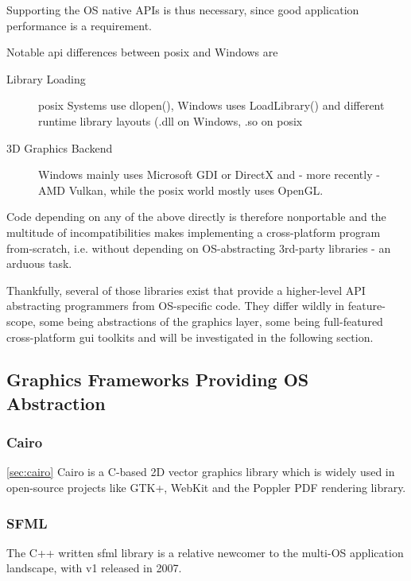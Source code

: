 Supporting the OS native APIs is thus necessary, since good application performance is a requirement.

Notable \gls{api} differences between \gls{posix} and Windows are
\begin{description}
	\item[Library Loading] \gls{posix} Systems use dlopen(), Windows uses LoadLibrary() and different runtime library layouts (.dll on Windows, .so on \gls{posix}
	\item[3D Graphics Backend] Windows mainly uses Microsoft GDI or DirectX and - more recently - AMD Vulkan, while the \gls{posix} world mostly uses OpenGL.
\end{description}

Code depending on any of the above directly is therefore nonportable and the multitude of incompatibilities makes implementing a cross-platform program from-scratch, i.e. without depending on OS-abstracting 3rd-party libraries - an arduous task.

Thankfully, several of those libraries exist that provide a higher-level API abstracting programmers from OS-specific code. They differ wildly in feature-scope, some being abstractions of the graphics layer, some being full-featured cross-platform \gls{gui} toolkits and will be investigated in the following section.

\subsection{Graphics Frameworks Providing OS Abstraction}
\label{sec:res_frameworks}

\subsubsection{Cairo}
\ref{sec:cairo}
Cairo is a C-based 2D vector graphics library which is widely used in open-source projects like GTK+, WebKit and the Poppler PDF rendering library.

\subsubsection{SFML}
The C++ written \gls{sfml} library is a relative newcomer to the multi-OS application landscape, with v1 released in 2007.


